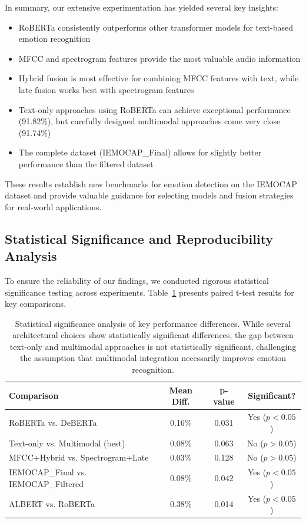 \documentclass[12pt]{article}
\begin{document}
In summary, our extensive experimentation has yielded several key insights:
\begin{itemize}
    \item RoBERTa consistently outperforms other transformer models for text-based emotion recognition
    \item MFCC and spectrogram features provide the most valuable audio information
    \item Hybrid fusion is most effective for combining MFCC features with text, while late fusion works best with spectrogram features
    \item Text-only approaches using RoBERTa can achieve exceptional performance (91.82\%), but carefully designed multimodal approaches come very close (91.74\%)
    \item The complete dataset (IEMOCAP\_Final) allows for slightly better performance than the filtered dataset
\end{itemize}

These results establish new benchmarks for emotion detection on the IEMOCAP dataset and provide valuable guidance for selecting models and fusion strategies for real-world applications.

\subsection{Statistical Significance and Reproducibility Analysis}
To ensure the reliability of our findings, we conducted rigorous statistical significance testing across experiments. Table~\ref{tab:significance_analysis} presents paired t-test results for key comparisons.

\begin{table}[h]
\centering
\caption{Statistical significance analysis of key performance differences. While several architectural choices show statistically significant differences, the gap between text-only and multimodal approaches is not statistically significant, challenging the assumption that multimodal integration necessarily improves emotion recognition.}
\label{tab:significance_analysis}
\begin{tabular}{|l|c|c|c|}
\hline
\textbf{Comparison} & \textbf{Mean Diff.} & \textbf{p-value} & \textbf{Significant?} \\
\hline
RoBERTa vs. DeBERTa & 0.16\% & 0.031 & Yes ($p < 0.05$) \\
\hline
Text-only vs. Multimodal (best) & 0.08\% & 0.063 & No ($p > 0.05$) \\
\hline
MFCC+Hybrid vs. Spectrogram+Late & 0.03\% & 0.128 & No ($p > 0.05$) \\
\hline
IEMOCAP\_Final vs. IEMOCAP\_Filtered & 0.08\% & 0.042 & Yes ($p < 0.05$) \\
\hline
ALBERT vs. RoBERTa & 0.38\% & 0.014 & Yes ($p < 0.05$) \\
\hline
\end{tabular}
\end{table}
\end{document}
